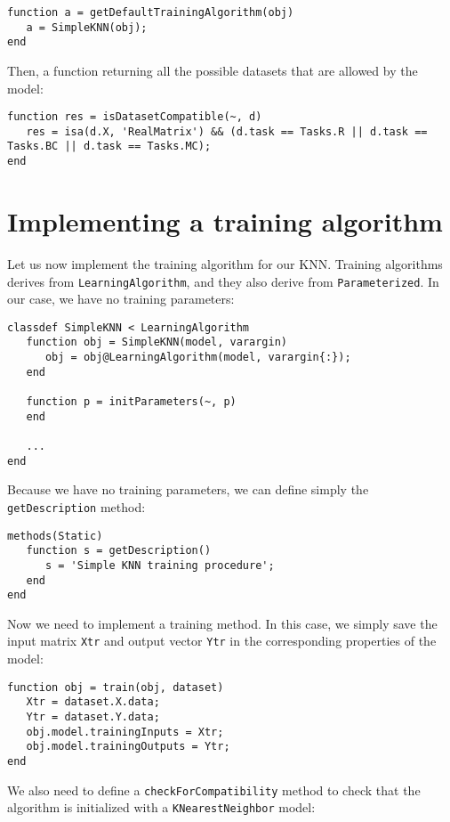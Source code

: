 \begin{lstlisting}
function a = getDefaultTrainingAlgorithm(obj)
   a = SimpleKNN(obj);
end
\end{lstlisting}

\noindent Then, a function returning all the possible datasets that are allowed by the model:

\begin{lstlisting}
function res = isDatasetCompatible(~, d)
   res = isa(d.X, 'RealMatrix') && (d.task == Tasks.R || d.task == Tasks.BC || d.task == Tasks.MC);
end
\end{lstlisting}

\section{Implementing a training algorithm}

Let us now implement the training algorithm for our KNN. Training algorithms derives from \verb|LearningAlgorithm|, and they also derive from \verb|Parameterized|. In our case, we have no training parameters:

\begin{lstlisting}
classdef SimpleKNN < LearningAlgorithm
   function obj = SimpleKNN(model, varargin)
      obj = obj@LearningAlgorithm(model, varargin{:});
   end
        
   function p = initParameters(~, p)
   end
   
   ...
end
\end{lstlisting}

\noindent Because we have no training parameters, we can define simply the \verb|getDescription| method:

\begin{lstlisting}
methods(Static)
   function s = getDescription()
      s = 'Simple KNN training procedure';
   end
end
\end{lstlisting}

\noindent Now we need to implement a training method. In this case, we simply save the input matrix \verb|Xtr| and output vector \verb|Ytr| in the corresponding properties of the model:

\begin{lstlisting}
function obj = train(obj, dataset)
   Xtr = dataset.X.data;
   Ytr = dataset.Y.data;
   obj.model.trainingInputs = Xtr;
   obj.model.trainingOutputs = Ytr;                    
end
\end{lstlisting}

\noindent We also need to define a \verb|checkForCompatibility| method to check that the algorithm is initialized with a \verb|KNearestNeighbor| model:


